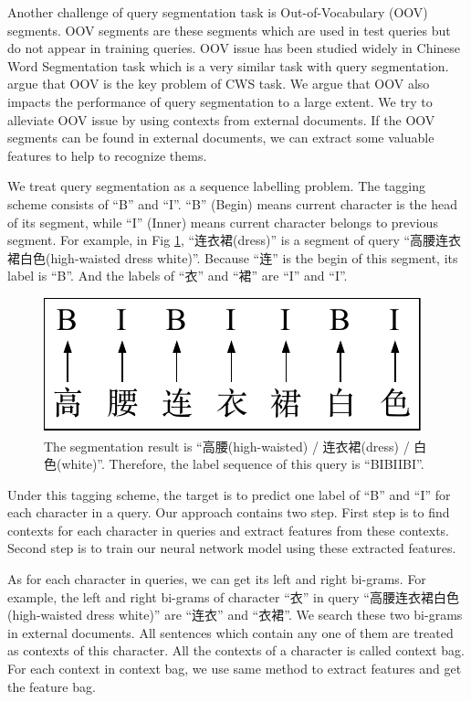 Another challenge of query segmentation task is Out-of-Vocabulary (OOV) segments. OOV segments are these segments which are used in test queries but do not appear in training queries. OOV issue has been studied widely in Chinese Word Segmentation task \cite{Xue2003Chinese,Jin2005A,Zhao2006An,huang2007chinese,Zheng2013Deep} which is a very similar task with query segmentation. \cite{huang2007chinese} argue that OOV is the key problem of CWS task. We argue that OOV also impacts the performance of query segmentation to a large extent. We try to alleviate OOV issue by using contexts from external documents. If the OOV segments can be found in external documents, we can extract some valuable features to help to recognize thems.

We treat query segmentation as a sequence labelling problem. The tagging scheme consists of ``B'' and ``I''. ``B'' (Begin) means current character is the head of its segment, while ``I'' (Inner) means current character belongs to previous segment. For example, in Fig \ref{fig:sq}, ``连衣裙(dress)'' is a segment of query ``高腰连衣裙白色(high-waisted dress white)''. Because ``连'' is the begin of this segment, its label is ``B''. And the labels of ``衣'' and ``裙'' are ``I'' and ``I''.

\begin{figure}[th]
	\centering
	\includegraphics[width=0.5\columnwidth]{figures/introduction.pdf}
	\caption{\small The segmentation result is ``高腰(high-waisted) / 连衣裙(dress) / 白色(white)''. Therefore, the label sequence of this query is ``BIBIIBI''.}
	\label{fig:sq}
	\vspace{-10pt}
\end{figure}

Under this tagging scheme, the target is to predict one label of ``B'' and ``I'' for each character in a query. Our approach contains two step. First step is to find contexts for each character in queries and extract features from these contexts. Second step is to train our neural network model using these extracted features.

As for each character in queries, we can get its left and right bi-grams. For example, the left and right bi-grams of character ``衣'' in query ``高腰连衣裙白色(high-waisted dress white)'' are ``连衣'' and ``衣裙''. We search these two bi-grams in external documents. All sentences which contain any one of them are treated as contexts of this character. All the contexts of a character is called context bag. For each context in context bag, we use same method to extract features and get the feature bag.

